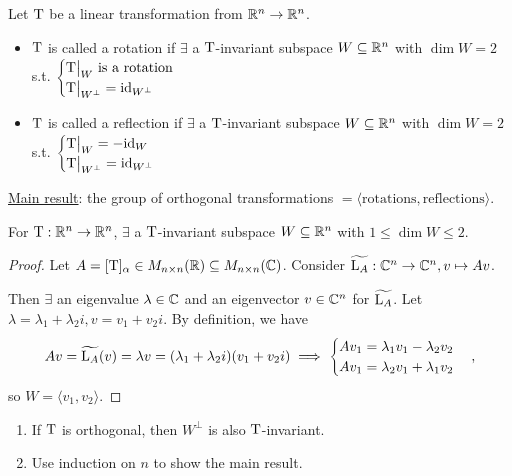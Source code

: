 \begin{definition}
  Let $\rm T$ be a linear transformation from $\mathbb{R}^n \to \mathbb{R}^n$.
  \begin{itemize}
    \item $\rm T$ is called a rotation if $\exists$ a $\rm T$-invariant
      subspace $W \subseteq \mathbb{R}^n$ with $\dim W = 2$ s.t.
      $\begin{cases}
        {\rm T} \big|_W \text{~is a rotation} \\
        {\rm T} \big|_{W^\bot} = {\rm id}_{W^\bot}
      \end{cases}$
    \item $\rm T$ is called a reflection if $\exists$ a $\rm T$-invariant
      subspace $W \subseteq \mathbb{R}^n$ with $\dim W = 2$ s.t.
      $\begin{cases}
        {\rm T} \big|_W = -{\rm id}_W \\
        {\rm T} \big|_{W^\bot} = {\rm id}_{W^\bot}
      \end{cases}$
  \end{itemize}
\end{definition}

\underline{Main result}: the group of orthogonal transformations
$= \langle \text{rotations}, \text{reflections} \rangle$.

\begin{prop}
  For ${\rm T}: \mathbb{R}^n \to \mathbb{R}^n$, $\exists$ a $\rm T$-invariant
  subspace $W \subseteq \mathbb{R}^n$ with $1 \le \dim W \le 2$.
  \begin{proof}
    Let $A=[{\rm T}]_\alpha \in M_{n\times n}(\mathbb{R}) \subseteq M_{n\times n}(\mathbb{C})$.
    Consider $\widetilde{{\rm L}_A}: \mathbb{C}^n \to \mathbb{C}^n, v \mapsto Av$.

    Then $\exists$ an eigenvalue $\lambda \in \mathbb{C}$ and an eigenvector
    $v \in \mathbb{C}^n$ for $\widetilde{{\rm L}_A}$.
    Let $\lambda = \lambda_1 + \lambda_2 i, v = v_1 + v_2 i$. By definition,
    we have
    \[
      Av = \widetilde{{\rm L}_A}(v) = \lambda v =
      (\lambda_1 + \lambda_2 i)(v_1 + v_2 i)
      \implies \begin{cases}
        Av_1 = \lambda_1 v_1 - \lambda_2 v_2 \\
        Av_1 = \lambda_2 v_1 + \lambda_1 v_2
      \end{cases},
    \]
    so $W = \langle v_1, v_2 \rangle$.
  \end{proof}
\end{prop}

\begin{exercise} \mbox{}
  \begin{enumerate}
    \item If $\rm T$ is orthogonal, then $W^\bot$ is also $\rm T$-invariant.
    \item Use induction on $n$ to show the main result.
  \end{enumerate}
\end{exercise}


